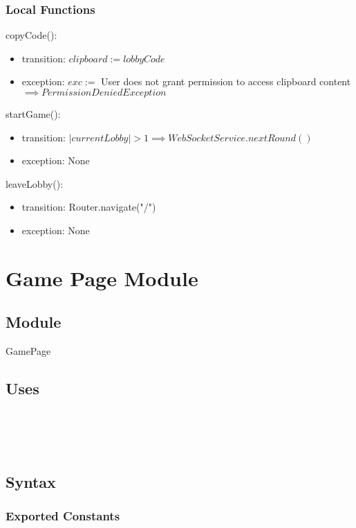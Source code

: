 \documentclass[12pt, titlepage]{article}
\begin{document}
\subsubsection{Local Functions}

\noindent copyCode():
\begin{itemize}
\item transition: $clipboard := lobbyCode$
\item exception: $exc := $ User does not grant permission to access clipboard content \\ $ \implies PermissionDeniedException$
\end{itemize}

\noindent startGame():
\begin{itemize}
\item transition: $|currentLobby| > 1 \implies WebSocketService.nextRound()$
\item exception: None
\end{itemize}

\noindent leaveLobby():
\begin{itemize}
\item transition: Router.navigate("/")
\item exception: None
\end{itemize}

\newpage

\section{Game Page Module} \label{GamePage} 

\subsection{Module}

GamePage

\subsection{Uses}
\\
\\
\\

\subsection{Syntax}

\subsubsection{Exported Constants}
\end{document}
